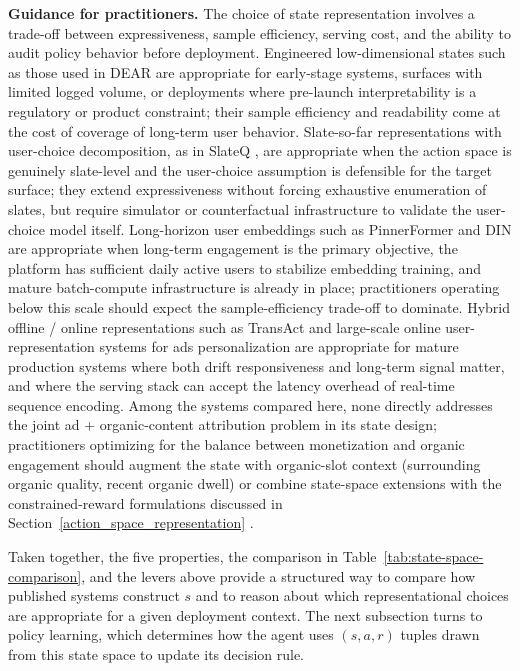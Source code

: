 \documentclass[manuscript,review,screen]{acmart}
\begin{document}
\textbf{Guidance for practitioners.}
The choice of state representation involves a trade-off between expressiveness, sample efficiency, serving cost, and the ability to audit policy behavior before deployment. Engineered low-dimensional states such as those used in DEAR \cite{zhao2021dear} are appropriate for early-stage systems, surfaces with limited logged volume, or deployments where pre-launch interpretability is a regulatory or product constraint; their sample efficiency and readability come at the cost of coverage of long-term user behavior. Slate-so-far representations with user-choice decomposition, as in SlateQ \cite{ie2019slateq}, are appropriate when the action space is genuinely slate-level and the user-choice assumption is defensible for the target surface; they extend expressiveness without forcing exhaustive enumeration of slates, but require simulator or counterfactual infrastructure to validate the user-choice model itself. Long-horizon user embeddings such as PinnerFormer \cite{pancha2022pinnerformer} and DIN \cite{Zhou2018} are appropriate when long-term engagement is the primary objective, the platform has sufficient daily active users to stabilize embedding training, and mature batch-compute infrastructure is already in place; practitioners operating below this scale should expect the sample-efficiency trade-off to dominate. Hybrid offline / online representations such as TransAct \cite{xia2023transact} and large-scale online user-representation systems for ads personalization \cite{zhang2024scaling} are appropriate for mature production systems where both drift responsiveness and long-term signal matter, and where the serving stack can accept the latency overhead of real-time sequence encoding. Among the systems compared here, none directly addresses the joint ad + organic-content attribution problem in its state design; practitioners optimizing for the balance between monetization and organic engagement should augment the state with organic-slot context (surrounding organic quality, recent organic dwell) or combine state-space extensions with the constrained-reward formulations discussed in Section~\ref{action_space_representation} \cite{zhang2018whole, yan2020ads}.

Taken together, the five properties, the comparison in Table~\ref{tab:state-space-comparison}, and the levers above provide a structured way to compare how published systems construct $s$ and to reason about which representational choices are appropriate for a given deployment context. The next subsection turns to policy learning, which determines how the agent uses $(s, a, r)$ tuples drawn from this state space to update its decision rule.
\end{document}
